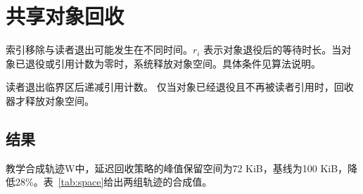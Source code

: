 \chapter{共享对象回收}
\label{ch:reclaim}
索引移除与读者退出可能发生在不同时间。$r_i$ 表示对象退役后的等待时长。当对象已退役或引用计数为零时，系统释放对象空间。具体条件见算法说明。

读者退出临界区后递减引用计数。
仅当对象已经退役且不再被读者引用时，回收器才释放对象空间。
\section{结果}
教学合成轨迹W中，延迟回收策略的峰值保留空间为72 KiB，基线为100 KiB，降低28\%。表~\ref{tab:space}给出两组轨迹的合成值。

